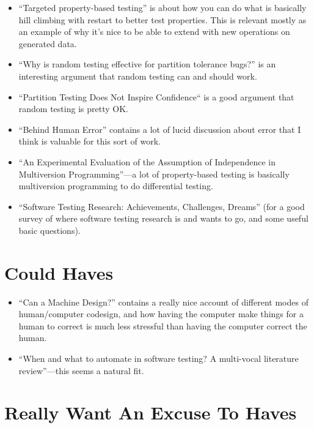 \begin{enumerate}
\begin{itemize}
\item ``Targeted property-based testing''\cite{DBLP:conf/issta/LoscherS17} is about how you can do what is basically hill climbing with restart to better test properties.
This is relevant mostly as an example of why it's nice to be able to extend with new operations on generated data.
\item ``Why is random testing effective for partition tolerance bugs?''\cite{DBLP:journals/pacmpl/MajumdarN18} is an interesting argument that random testing can and should work.
\item ``Partition Testing Does Not Inspire Confidence``\cite{DBLP:journals/tse/HamletT90} is a good argument that random testing is pretty OK.\ 
\item ``Behind Human Error''\cite{BehindHumanError} contains a lot of lucid discussion about error that I think is valuable for this sort of work.
\item ``An Experimental Evaluation of the Assumption of Independence in Multiversion Programming''\cite{DBLP:journals/tse/KnightL86}---a
lot of property-based testing is basically multiversion programming to do differential testing.
\item ``Software Testing Research: Achievements, Challenges, Dreams''\cite{DBLP:conf/icse/Bertolino07} (for a good survey of where software testing research is and wants to go, and some useful basic questions).
\end{itemize}

\section{Could Haves}

\begin{itemize}
\item ``Can a Machine Design?''\cite{doi:10.1162/07479360152681083} contains a really nice account of different modes of human/computer codesign,
and how having the computer make things for a human to correct is much less stressful than having the computer correct the human.
\item ``When and what to automate in software testing? {A} multi-vocal literature review''\cite{DBLP:journals/infsof/GarousiM16}---this
seems a natural fit.
\end{itemize}

\section{Really Want An Excuse To Haves}


\end{enumerate}
